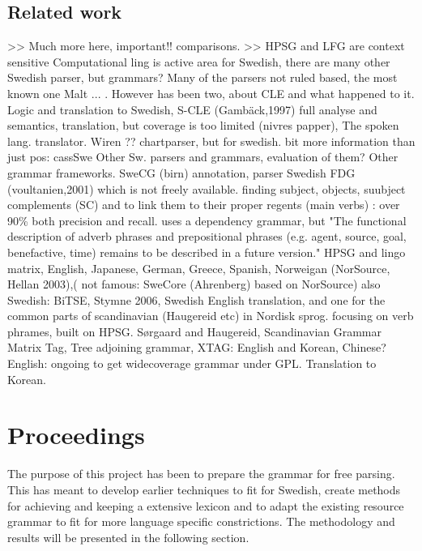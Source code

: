 \documentclass{report}
\begin{document}
\section{Related work}
>> Much more here, important!! comparisons.
>> HPSG and LFG are context sensitive
Computational ling is active area for Swedish, there are many other Swedish parser,
but grammars?
Many of the parsers not ruled based, the most known one Malt\cite{malt} ... .
However has been two, about CLE\cite{cle} and what happened to it. Logic and translation
to Swedish, S-CLE (Gambäck,1997) full analyse and semantics, translation,
but coverage is too limited (nivres papper), The
spoken lang. translator\cite{cle2}. Wiren \cite{wiren}?? chartparser, but for swedish. bit more information than
just pos: cassSwe \cite{casswe}
Other Sw. parsers and grammars, evaluation of them? 
Other grammar frameworks.
SweCG (birn) annotation, parser Swedish FDG (voultanien,2001) which is not freely available.
finding subject, objects, suubject complements (SC) and
to link them to their proper regents (main verbs) : over 90\% both precision and recall.
uses a dependency grammar, but "The functional description of adverb phrases
and prepositional phrases (e.g. agent, source, goal, benefactive, time) remains
to be described in a future version." 
HPSG\cite{hpsg} and lingo matrix\cite{lingomatrix}, English, Japanese, German,
Greece, Spanish, Norweigan (NorSource, Hellan 2003),( not famous: SweCore
(Ahrenberg) based on NorSource)
also Swedish: BiTSE\cite{stymne}, Stymne 2006, Swedish English translation,
and one for the common parts of scandinavian (Haugereid etc) in Nordisk sprog.
focusing on verb phrames, built on HPSG.
S\o rgaard and Haugereid, Scandinavian Grammar Matrix\cite{scandmatrix}
Tag, Tree adjoining grammar, XTAG: English and Korean, Chinese? English: ongoing to get widecoverage grammar
under GPL. Translation to Korean.

\chapter{Proceedings}
The purpose of this project has been to prepare the grammar for free parsing.
This has meant to develop earlier techniques to fit for Swedish, create methods
for achieving and keeping a extensive lexicon and to adapt the existing
resource grammar to fit for more language specific constrictions.
The methodology and results will be presented in the following section.
\end{document}
